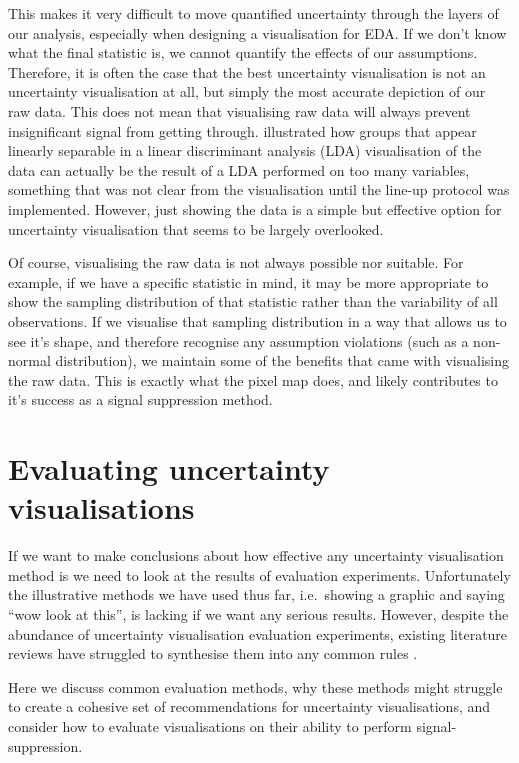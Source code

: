 \documentclass[
  12pt]{article}
\begin{document}
This makes it very difficult to move quantified uncertainty through the
layers of our analysis, especially when designing a visualisation for
EDA. If we don't know what the final statistic is, we cannot quantify
the effects of our assumptions. Therefore, it is often the case that the
best uncertainty visualisation is not an uncertainty visualisation at
all, but simply the most accurate depiction of our raw data. This does
not mean that visualising raw data will always prevent insignificant
signal from getting through. \citet{Chowdhury} illustrated how groups
that appear linearly separable in a linear discriminant analysis (LDA)
visualisation of the data can actually be the result of a LDA performed
on too many variables, something that was not clear from the
visualisation until the line-up protocol was implemented. However, just
showing the data is a simple but effective option for uncertainty
visualisation that seems to be largely overlooked.

Of course, visualising the raw data is not always possible nor suitable.
For example, if we have a specific statistic in mind, it may be more
appropriate to show the sampling distribution of that statistic rather
than the variability of all observations. If we visualise that sampling
distribution in a way that allows us to see it's shape, and therefore
recognise any assumption violations (such as a non-normal distribution),
we maintain some of the benefits that came with visualising the raw
data. This is exactly what the pixel map does, and likely contributes to
it's success as a signal suppression method.

\section{Evaluating uncertainty
visualisations}\label{evaluating-uncertainty-visualisations}

If we want to make conclusions about how effective any uncertainty
visualisation method is we need to look at the results of evaluation
experiments. Unfortunately the illustrative methods we have used thus
far, i.e.~showing a graphic and saying ``wow look at this'', is lacking
if we want any serious results. However, despite the abundance of
uncertainty visualisation evaluation experiments, existing literature
reviews have struggled to synthesise them into any common rules
\citep{Kinkeldey2014, Hullman2016}.

Here we discuss common evaluation methods, why these methods might
struggle to create a cohesive set of recommendations for uncertainty
visualisations, and consider how to evaluate visualisations on their
ability to perform signal-suppression.
\end{document}

